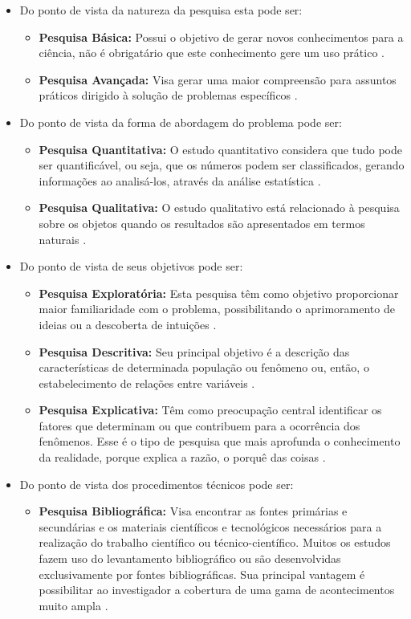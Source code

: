 \begin{itemize}
	\item Do ponto de vista da natureza da pesquisa esta pode ser:
		\begin{itemize}
			\item \textbf{Pesquisa Básica:} Possui o objetivo de gerar novos conhecimentos para a ciência, não é obrigatário que este conhecimento gere um uso prático \cite{Silva:Tafner:2007}.
			\item \textbf{Pesquisa Avançada:} Visa gerar uma maior compreensão para assuntos práticos dirigido à solução de problemas específicos \cite{Silva:Tafner:2007}.
		\end{itemize}

	\item Do ponto de vista da forma de abordagem do problema pode ser:
		\begin{itemize}
			\item \textbf{Pesquisa Quantitativa:} O estudo quantitativo considera que tudo pode ser quantificável, ou seja, que os números podem ser classificados, gerando informações ao analisá-los, através da análise estatística \cite{Travassos:2002}.
			\item \textbf{Pesquisa Qualitativa:} O estudo qualitativo está relacionado à pesquisa sobre os objetos quando os resultados são apresentados em termos naturais \cite{Travassos:2002}.
		\end{itemize}

	\item Do ponto de vista de seus objetivos pode ser:
		\begin{itemize}
			\item \textbf{Pesquisa Exploratória:} Esta pesquisa têm como objetivo proporcionar maior familiaridade com o problema, possibilitando o aprimoramento de ideias ou a descoberta de intuições \cite{Gil:2010}.
			\item \textbf{Pesquisa Descritiva:} Seu principal objetivo é a descrição das características de determinada população ou fenômeno ou, então, o estabelecimento de relações entre variáveis \cite{Gil:2010}.
			\item \textbf{Pesquisa Explicativa:} Têm como preocupação central identificar os fatores que determinam ou que contribuem para a ocorrência dos fenômenos. Esse é o tipo de pesquisa que mais aprofunda o conhecimento da realidade, porque explica a razão, o porquê das coisas \cite{Gil:2010}.
		\end{itemize}

	\item Do ponto de vista dos procedimentos técnicos pode ser:
		\begin{itemize}
			\item \textbf{Pesquisa Bibliográfica:} Visa encontrar as fontes primárias e secundárias e os materiais científicos e tecnológicos necessários para a realização do trabalho científico ou técnico-científico. Muitos os estudos fazem uso do levantamento bibliográfico ou são desenvolvidas exclusivamente por fontes bibliográficas. Sua principal vantagem é possibilitar ao investigador a cobertura de uma gama de acontecimentos muito ampla \cite{Silva:Tafner:2007}.


\end{itemize}
\end{itemize}
